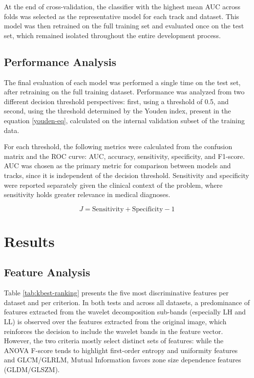 \documentclass[12pt,a4paper]{article}
\begin{document}
At the end of cross-validation, the classifier with the highest mean AUC across folds was selected as the representative model for each track and dataset. This model was then retrained on the full training set and evaluated once on the test set, which remained isolated throughout the entire development process.

\subsection{Performance Analysis}

The final evaluation of each model was performed a single time on the test set, after retraining on the full training dataset. Performance was analyzed from two different decision threshold perspectives: first, using a threshold of 0.5, and second, using the threshold determined by the Youden index, present in the equation \eqref{youden-eq}, calculated on the internal validation subset of the training data.

For each threshold, the following metrics were calculated from the confusion matrix and the ROC curve: AUC, accuracy, sensitivity, specificity, and F1-score. AUC was chosen as the primary metric for comparison between models and tracks, since it is independent of the decision threshold. Sensitivity and specificity were reported separately given the clinical context of the problem, where sensitivity holds greater relevance in medical diagnoses.

\begin{equation}
    J = \text{Sensitivity} + \text{Specificity} - 1
    \label{youden-eq}
\end{equation}

\section{Results}
\subsection{Feature Analysis}

Table \ref{tab:kbest-ranking} presents the five most discriminative features per dataset and per criterion. In both tests and across all datasets, a predominance of features extracted from the wavelet decomposition sub-bands (especially LH and LL) is observed over the features extracted from the original image, which reinforces the decision to include the wavelet bands in the feature vector. However, the two criteria mostly select distinct sets of features: while the ANOVA F-score tends to highlight first-order entropy and uniformity features and GLCM/GLRLM, Mutual Information favors zone size dependence features (GLDM/GLSZM).
\end{document}
